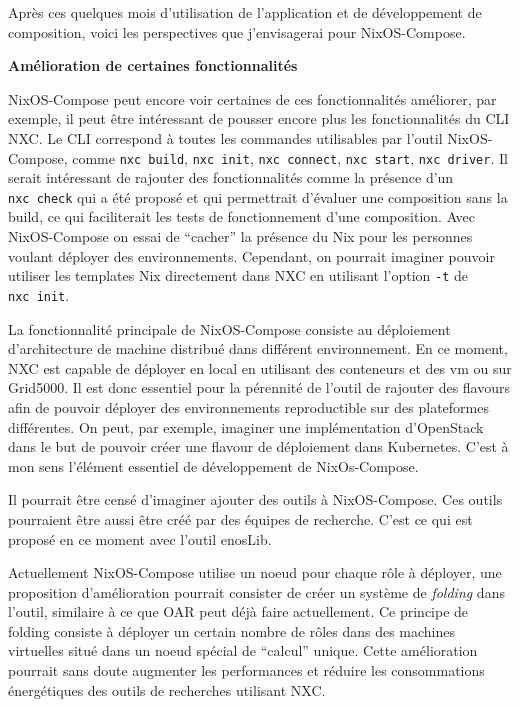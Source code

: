 \documentclass[a4paper,french,12pt, titlepage]{article}
\begin{document}
Après ces quelques mois d'utilisation de l'application et de
développement de composition, voici les perspectives que j'envisagerai
pour NixOS-Compose.\newline

\textbf{Amélioration de certaines fonctionnalités}\newline

NixOS-Compose peut encore voir certaines de ces fonctionnalités
améliorer, par exemple, il peut être intéressant de pousser encore plus
les fonctionnalités du CLI NXC. Le CLI correspond à toutes les commandes
utilisables par l'outil NixOS-Compose, comme \texttt{nxc\ build},
\texttt{nxc\ init}, \texttt{nxc\ connect}, \texttt{nxc\ start},
\texttt{nxc\ driver}. Il serait intéressant de rajouter des
fonctionnalités comme la présence d'un \texttt{nxc\ check} qui a été
proposé et qui permettrait d'évaluer une composition sans la build, ce
qui faciliterait les tests de fonctionnement d'une composition. Avec
NixOS-Compose on essai de ``cacher'' la présence du Nix pour les
personnes voulant déployer des environnements. Cependant, on pourrait
imaginer pouvoir utiliser les templates Nix directement dans NXC en
utilisant l'option \texttt{-t} de \texttt{nxc\ init}.\newline

La fonctionnalité principale de NixOS-Compose consiste au déploiement
d'architecture de machine distribué dans différent environnement. En ce
moment, NXC est capable de déployer en local en utilisant des conteneurs
et des vm ou sur Grid5000. Il est donc essentiel pour la pérennité de
l'outil de rajouter des flavours afin de pouvoir déployer des
environnements reproductible sur des plateformes différentes. On peut,
par exemple, imaginer une implémentation d'OpenStack dans le but de
pouvoir créer une flavour de déploiement dans Kubernetes. C'est à mon
sens l'élément essentiel de développement de NixOs-Compose.\newline

Il pourrait être censé d'imaginer ajouter des outils à NixOS-Compose.
Ces outils pourraient être aussi être créé par des équipes de recherche.
C'est ce qui est proposé en ce moment avec l'outil enosLib.\newline

Actuellement NixOS-Compose utilise un noeud pour chaque rôle à déployer,
une proposition d'amélioration pourrait consister de créer un système de
\emph{folding} dans l'outil, similaire à ce que OAR peut déjà faire
actuellement. Ce principe de folding consiste à déployer un certain
nombre de rôles dans des machines virtuelles situé dans un noeud spécial
de ``calcul'' unique. Cette amélioration pourrait sans doute augmenter
les performances et réduire les consommations énergétiques des outils de
recherches utilisant NXC.\newline
\end{document}
